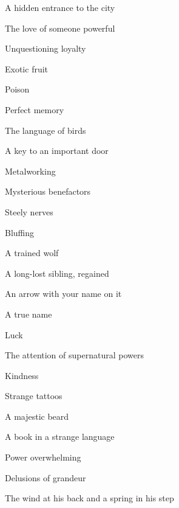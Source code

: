  
\item A hidden entrance to the city

 
\item The love of someone powerful

 
\item Unquestioning loyalty

 
\item Exotic fruit

 
\item Poison

 
\item Perfect memory

 
\item The language of birds

 
\item A key to an important door

 
\item Metalworking

 
\item Mysterious benefactors

 
\item Steely nerves

 
\item Bluffing

 
\item A trained wolf

 
\item A long-lost sibling, regained

 
\item An arrow with your name on it

 
\item A true name

 
\item Luck

 
\item The attention of supernatural powers

 
\item Kindness

 
\item Strange tattoos

 
\item A majestic beard

 
\item A book in a strange language

 
\item Power overwhelming

 
\item Delusions of grandeur

 
\item The wind at his back and a spring in his step


\stopitemize
 




\stopcolumns
\page
\startcolumns[n=4]
\completeindex


